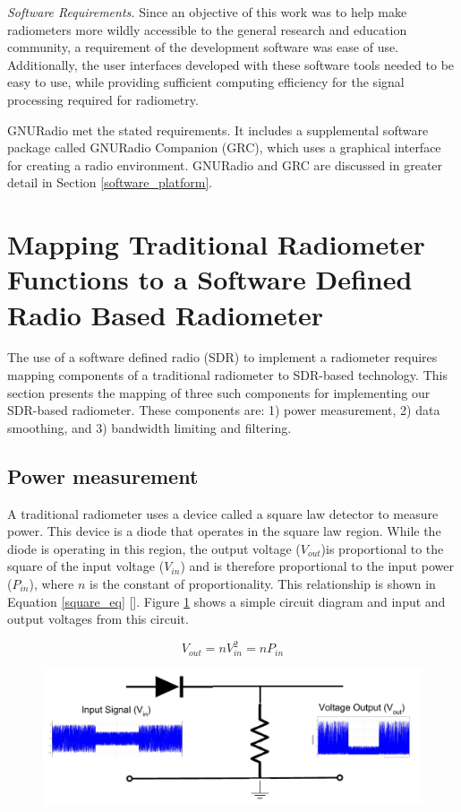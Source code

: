 \emph{Software Requirements.}  Since an objective of this work was to help make radiometers more wildly accessible to the general research and education community, a requirement of the development software was ease of use.  Additionally, the user interfaces developed with these software tools needed to be easy to use, while providing sufficient computing efficiency for the signal processing required for radiometry.

GNURadio met the stated requirements.  It includes a supplemental software package called GNURadio Companion (GRC), which uses a graphical interface for creating a radio environment.  GNURadio and GRC are discussed in greater detail in Section \ref{software_platform}.

\section{Mapping Traditional Radiometer Functions to a Software Defined Radio Based Radiometer}

The use of a software defined radio (SDR) to implement a radiometer requires mapping components of a traditional radiometer to SDR-based technology.  This section presents the mapping of three such components for implementing our SDR-based radiometer.  These components are:  1) power measurement, 2) data smoothing, and 3) bandwidth limiting and filtering.

\subsection{Power measurement}

A traditional radiometer uses a device called a square law detector to measure power.  This device is a diode that operates in the square law region.  While the diode is operating in this region, the output voltage ($V_{out}$)is proportional to the square of the input voltage ($V_{in}$) and is therefore proportional to the input power ($P_{in}$), where $n$ is the constant of proportionality.  This relationship is shown in Equation \ref{square_eq} [\cite{Navy_detector}].  Figure \ref{square_law_simple} shows a simple circuit diagram and input and output voltages from this circuit.

\begin{equation}\label{square_eq}
V_{out} = nV_{in}^2 = nP_{in}
\end{equation}

{\begin{figure}[h!tb] 
\centering
\includegraphics[width=17cm]{Images/square_law.pdf}
\label{square_law_simple}
\end{figure}
}

